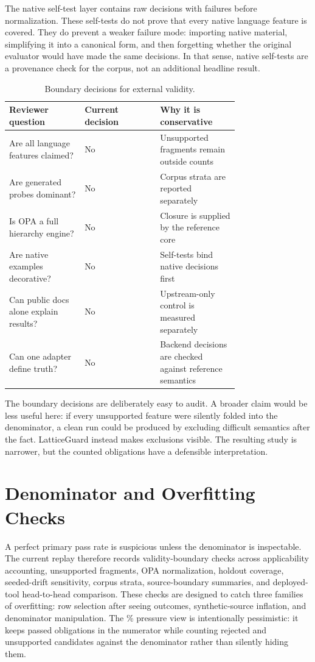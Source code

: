 \documentclass[10pt,conference]{IEEEtran}
\begin{document}
The native self-test layer contains \LGNativeSelftests{} raw decisions with \LGNativeFailures{} failures before normalization.  These self-tests do not prove that every native language feature is covered.  They do prevent a weaker failure mode: importing native material, simplifying it into a canonical form, and then forgetting whether the original evaluator would have made the same decisions.  In that sense, native self-tests are a provenance check for the corpus, not an additional headline result.

\begin{table}[t]
\centering
\caption{Boundary decisions for external validity.}
\label{tab:boundarydecisions}
\begin{tabular}{p{0.25\linewidth}p{0.25\linewidth}p{0.25\linewidth}}
\toprule
Reviewer question & Current decision & Why it is conservative \\
\midrule
Are all language features claimed? & No & Unsupported fragments remain outside counts \\
Are generated probes dominant? & No & Corpus strata are reported separately \\
Is OPA a full hierarchy engine? & No & Closure is supplied by the reference core \\
Are native examples decorative? & No & Self-tests bind native decisions first \\
Can public docs alone explain results? & No & Upstream-only control is measured separately \\
Can one adapter define truth? & No & Backend decisions are checked against reference semantics \\
\bottomrule
\end{tabular}
\end{table}

The boundary decisions are deliberately easy to audit.  A broader claim would be less useful here: if every unsupported feature were silently folded into the denominator, a clean run could be produced by excluding difficult semantics after the fact.  LatticeGuard instead makes exclusions visible.  The resulting study is narrower, but the counted obligations have a defensible interpretation.

\section{Denominator and Overfitting Checks}
A perfect primary pass rate is suspicious unless the denominator is inspectable.  The current replay therefore records \LGValidityBoundaryChecks{} validity-boundary checks across applicability accounting, unsupported fragments, OPA normalization, holdout coverage, seeded-drift sensitivity, corpus strata, source-boundary summaries, and deployed-tool head-to-head comparison.  These checks are designed to catch three families of overfitting: row selection after seeing outcomes, synthetic-source inflation, and denominator manipulation.  The \LGAllCandidatePassRate{}\% pressure view is intentionally pessimistic: it keeps \LGPrimaryPasses{} passed obligations in the numerator while counting rejected and unsupported candidates against the denominator rather than silently hiding them.
\end{document}
